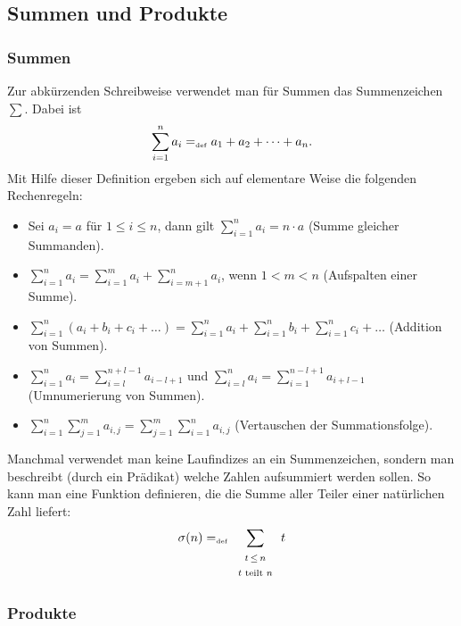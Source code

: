 \subsection{Summen und Produkte}

\subsubsection{Summen}
Zur abkürzenden Schreibweise verwendet man für Summen das
Summenzeichen $\sum$\index{$\sum$}. Dabei ist
\begin{displaymath}
\sum_{i=1}^n a_i =_{\mathrm{\scriptscriptstyle def}} a_1 + a_2 + \dots + a_n.
\end{displaymath}
Mit Hilfe dieser Definition ergeben sich auf elementare Weise die
folgenden Rechenregeln:
\begin{itemize}
%
\item Sei $a_i = a$ für $1 \le i \le n$, dann gilt $\sum\limits_{i=1}^n a_i =
  n \cdot a$ (Summe gleicher Summanden).
%
\item $\sum\limits_{i=1}^n a_i = \sum\limits_{i=1}^m a_i +
  \sum\limits_{i = m + 1}^n a_i$, wenn $1 < m < n$ (Aufspalten einer Summe).
%
\item $\sum\limits_{i=1}^n (a_i + b_i + c_i + \dots) =
  \sum\limits_{i=1}^n a_i + \sum\limits_{i=1}^n b_i +
  \sum\limits_{i=1}^n c_i + \dots$ (Addition von Summen).
%
\item $\sum\limits_{i=1}^n a_i = \sum\limits_{i=l}^{n + l - 1} a_{i-l+1}$
  und $\sum\limits_{i=l}^n a_i = \sum\limits_{i=1}^{n - l + 1} a_{i + l
  - 1}$
  (Umnumerierung von Summen).
%
\item $\sum\limits_{i=1}^n \sum\limits_{j=1}^m a_{i,j} =
  \sum\limits_{j=1}^m \sum\limits_{i=1}^n a_{i,j}$ (Vertauschen der Summationsfolge).
%
\end{itemize}
Manchmal verwendet man keine Laufindizes an ein Summenzeichen, sondern man beschreibt 
(durch ein Prädikat) welche Zahlen aufsummiert werden sollen. So kann man eine Funktion definieren,
die die Summe aller Teiler einer natürlichen Zahl liefert:
\begin{displaymath}
\sigma(n) =_{\mathrm{\scriptscriptstyle def}} \sum\limits_{\begin{array}{c}\scriptstyle t\, \le\, n\\\scriptstyle t \text{ teilt } n\end{array}} t
\end{displaymath}

\subsubsection{Produkte}

